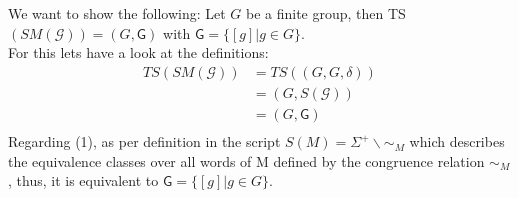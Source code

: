\documentclass[a4paper,12pt,numbers=noenddot]{scrreport}
\begin{document}
\section{}
We want to show the following: Let $G$ be a finite group, then TS$(SM(\mathcal{G})) = (G,\mathsf{G})$ with $\mathsf{G}= \{ [g]|g\in G\}$.\\
For this lets have a look at the definitions:
\begin{align*}
    TS(SM(\mathcal{G})) &= TS((G,G,\delta)) \tag{Def. 8.10} \\
                        &= (G, S(\mathcal{G})) \tag{3.18} \\
                        &= (G, \mathsf{G}) \tag{(1), 3.10}\\ 
\end{align*}
Regarding (1), as per definition in the script $S(M) = \Sigma^+ \backslash \sim_M$ which describes the equivalence classes over all words of M defined by the congruence relation $\sim_M$, thus, it is equivalent to $\mathsf{G}= \{ [g]|g\in G\}$.
\section{}
\end{document}
